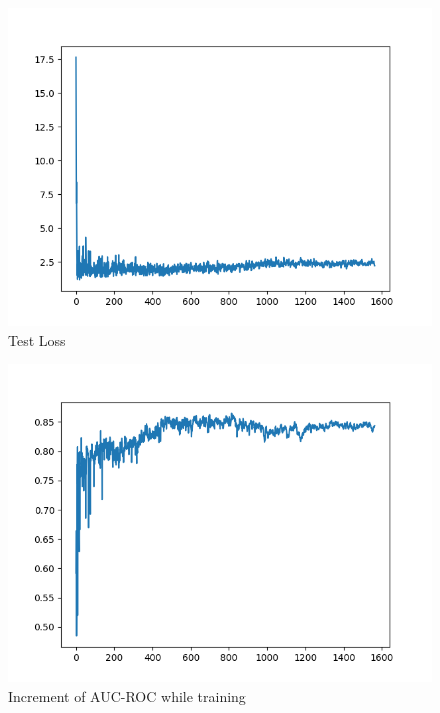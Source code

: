 \documentclass[sigconf]{acmart}
\begin{document}
\begin{figure}
  \includegraphics[width=1.1\linewidth]{testLoss.png}
  \caption{Test Loss}
  \label{testFig}
\end{figure}

\begin{figure}
  \includegraphics[width=1.1\linewidth]{aucroc.png}
  \caption{Increment of AUC-ROC while training}
  \label{aucrocFig}
\end{figure}
\end{document}
